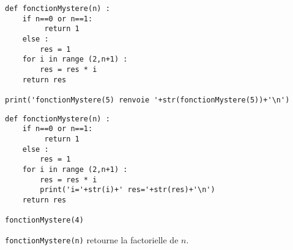 \begin{minipage}{0.5\textwidth}

\begin{lstlisting}
def fonctionMystere(n) :
    if n==0 or n==1:
         return 1
    else :
        res = 1
    for i in range (2,n+1) :
        res = res * i
    return res

print('fonctionMystere(5) renvoie '+str(fonctionMystere(5))+'\n')
\end{lstlisting}
\end{minipage}
\begin{minipage}{0.5\textwidth}

\begin{lstlisting}
def fonctionMystere(n) :
    if n==0 or n==1:
         return 1
    else :
        res = 1
    for i in range (2,n+1) :
        res = res * i
        print('i='+str(i)+' res='+str(res)+'\n')
    return res

fonctionMystere(4)
\end{lstlisting}
\end{minipage}





\texttt{fonctionMystere(n)} retourne la factorielle de $n$.